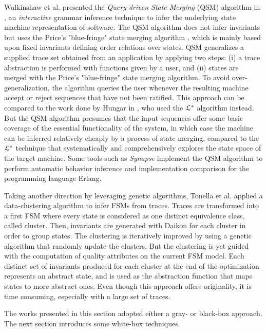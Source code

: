 Walkinshaw et al. presented the \textit{Query-driven State
Merging} (QSM) algorithm in
\cite{Walkinshaw07reverseengineering}, an \textit{interactive}
grammar inference technique to infer the underlying state machine
representation of software. The QSM algorithm does not infer
invariants but uses the Price's "blue-fringe" state merging
algorithm \cite{Lang:1998:RAO:645517.655780}, which is mainly
based upon fixed invariants defining order relations over states.
QSM generalizes a supplied trace set obtained from an application
by applying two steps: (i) a trace abstraction is performed
with functions given by a user, and (ii) states are merged with
the Price's "blue-fringe" state merging algorithm. To avoid
over-generalization, the algorithm queries the user whenever the
resulting machine accept or reject sequences that have not
been ratified. This approach can be compared to the work done by
Hungar in \cite{hungar}, who used the $\EuScript{L}^*$ algorithm
instead. But the QSM algorithm presumes that the input sequences
offer some basic coverage of the essential functionality of the
system, in which case the machine can be inferred relatively
cheaply by a process of state merging, compared to the
$\EuScript{L}^*$ technique that systematically and
comprehensively explores the state space of the target machine.
Some tools such as \textit{Synapse}
\cite{LamelaSeijas:2014:SAB:2633448.2633457} implement the QSM
algorithm to perform automatic behavior inference and
implementation comparison for the programming language Erlang.

Taking another direction by leveraging genetic algorithms,
Tonella et al. \cite{TonellaNMLH13} applied a data-clustering
algorithm to infer FSMs from traces. Traces are transformed into a
first FSM where every state is considered as one distinct
equivalence class, called cluster. Then, invariants are generated
with Daikon for each cluster in order to group states. The
clustering is iteratively improved by using a genetic algorithm
that randomly update the clusters. But the clustering is yet
guided with the computation of quality attributes on the current
FSM model. Each distinct set of invariants produced for each
cluster at the end of the optimization represents an abstract
state, and is used as the abstraction function that maps states
to more abstract ones. Even though this approach offers
originality, it is time consuming, especially with a large set of
traces.

The works presented in this section adopted either a gray- or
black-box approach. The next section introduces some white-box
techniques.

